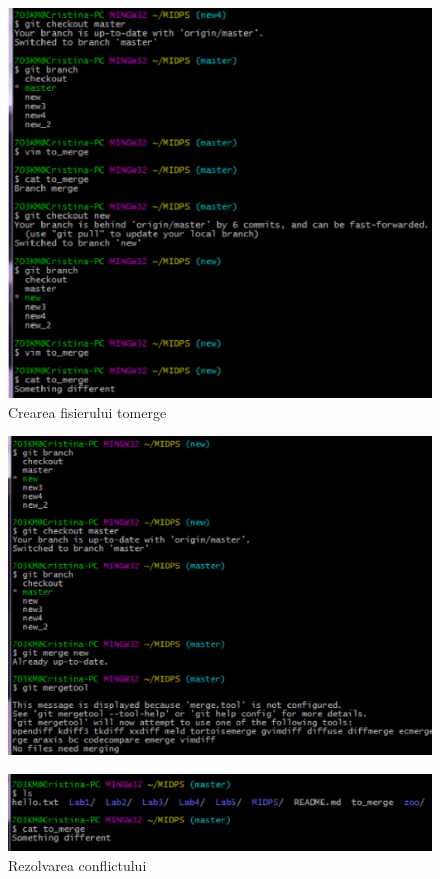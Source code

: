 \documentclass[11pt]{article}
\begin{document}
\begin{figure}[h]
\includegraphics{images/19.eps}
\caption{Crearea fisierului tomerge}
\end{figure}

\begin{figure}[h]
\includegraphics{images/20.eps}
\end{figure}

\begin{figure}[h]
\includegraphics{images/21.eps}
\caption{Rezolvarea conflictului}
\end{figure}
\end{document}

